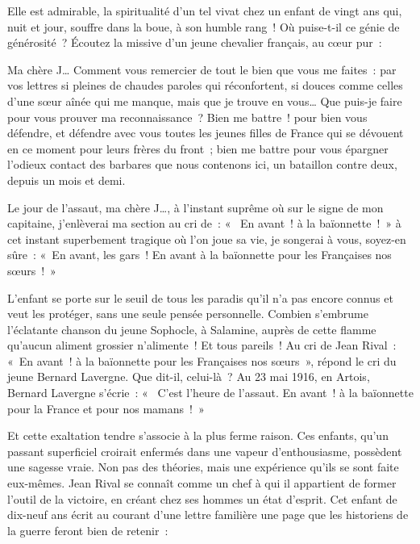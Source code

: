 \documentclass[french,twoside]{book} %
\newenvironment{quoteblock}%
  {\begin{quoting}}
  {\end{quoting}}
\newenvironment{quotebar}{%
    \def\FrameCommand{{\color{rubric!10!}\vrule width 0.5em} \hspace{0.9em}}%
    \def\OuterFrameSep{\itemsep} %
    \MakeFramed {\advance\hsize-\width \FrameRestore}
  }%
  {%
    \endMakeFramed
  }
\renewenvironment{quoteblock}%
  {%
    \savenotes
    \setstretch{0.9}
    \normalfont
    \begin{quotebar}
  }
  {%
    \end{quotebar}
    \spewnotes
  }
\begin{document}
\noindent Elle est admirable, la spiritualité d’un tel vivat chez un enfant de vingt ans qui, nuit et jour, souffre dans la boue, à son humble rang ! Où puise-t-il ce génie de générosité ? Écoutez la missive d’un jeune chevalier français, au cœur pur :‌\par

\begin{quoteblock}
 \noindent Ma chère J… Comment vous remercier de tout le bien que vous me faites : par vos lettres si pleines de chaudes paroles qui réconfortent, si douces comme celles d’une sœur aînée qui me manque, mais que je trouve en vous… Que puis-je faire pour vous prouver ma reconnaissance ? Bien me battre ! pour bien vous défendre, et défendre avec vous toutes les jeunes filles de France qui se dévouent en ce moment pour leurs frères du front ; bien me battre pour vous épargner l’odieux contact des barbares que nous contenons ici, un bataillon contre deux, depuis un mois et demi.‌\par
 Le jour de l’assaut, ma chère J…, à l’instant suprême où sur le signe de mon capitaine, j’enlèverai ma section au cri de : «  En avant ! à la baïonnette ! » à cet instant superbement tragique où l’on joue sa vie, je songerai à vous, soyez-en sûre : « En avant, les gars ! En avant à la baïonnette pour les Françaises nos sœurs ! »‌
 \end{quoteblock}

\noindent L’enfant se porte sur le seuil de tous les paradis qu’il n’a pas encore connus et veut les protéger, sans une seule pensée personnelle. Combien s’embrume l’éclatante chanson du jeune Sophocle, à Salamine, auprès de cette flamme qu’aucun aliment grossier n’alimente ! Et tous pareils ! Au cri de Jean Rival : « En avant ! à la baïonnette pour les Françaises nos sœurs », répond le cri du jeune Bernard Lavergne. Que dit-il, celui-là ? Au 23 mai 1916, en Artois, Bernard Lavergne s’écrie : «  C’est l’heure de l’assaut. En avant ! à la baïonnette pour la France et pour nos mamans ! »‌\par
Et cette exaltation tendre s’associe à la plus ferme raison. Ces enfants, qu’un passant superficiel croirait enfermés dans une vapeur d’enthousiasme, possèdent une sagesse vraie. Non pas des théories, mais une expérience qu’ils se sont faite eux-mêmes. Jean Rival se connaît comme un chef à qui il appartient de former l’outil de la victoire, en créant chez ses hommes un état d’esprit. Cet enfant de dix-neuf ans écrit au courant d’une lettre familière une page que les historiens de la guerre feront bien de retenir :‌\par
\end{document}
